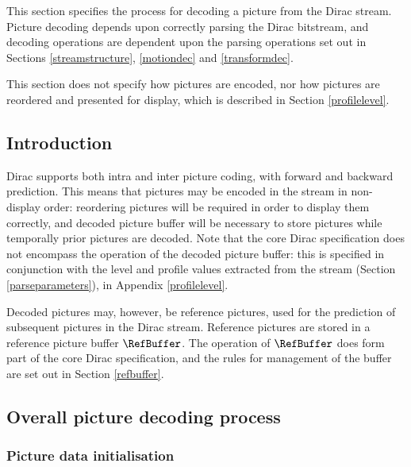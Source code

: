 
\label{picturedec}

This section specifies the process for decoding a picture from the Dirac stream. Picture decoding depends upon
correctly parsing the Dirac bitstream, and decoding operations are dependent upon the parsing operations
set out in Sections \ref{streamstructure}, \ref{motiondec} and \ref{transformdec}.

This section does not specify how pictures are encoded, nor how pictures are reordered and presented for display, which is described in Section \ref{profilelevel}. 

\subsection{Introduction}

Dirac supports both intra and inter picture coding, with forward and backward prediction. This means that
pictures may be encoded in the stream in non-display order: reordering pictures will be required in order
to display them correctly, and  decoded picture buffer will be necessary to store pictures while temporally 
prior pictures are decoded. Note that the core Dirac specification does not encompass the operation of the
decoded picture buffer: this is specified in conjunction with the level and profile values extracted from
the stream (Section \ref{parseparameters}), in Appendix \ref{profilelevel}. 

Decoded pictures may, however, be reference pictures, used for the prediction of subsequent pictures
in the Dirac stream. Reference pictures are stored in a reference picture buffer $\RefBuffer$. The operation
of $\RefBuffer$ does form part of the core Dirac specification, and the rules for management of the
buffer are set out in Section \ref{refbuffer}.

\subsection{Overall picture decoding process}
\label{overallpicturedec}

\subsubsection{Picture data initialisation}
\label{picdataconventions}

